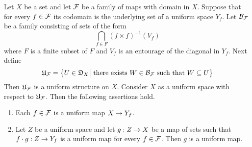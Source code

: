 \begin{theorem}\label{theorem:uniformity_induced_by_family_of_maps}
	Let $X$ be a set and let ${\mathcal F}$ be a family of maps with domain in $X$. Suppose that for every $f \in {\mathcal F}$ its codomain is the underlying set of a uniform space $Y_f$. Let ${\mathcal B}_{{\mathcal F}}$ be a family consisting of sets of the form
	$$\bigcap_{f\in F}\left(f\times f\right)^{-1}(V_f)$$
	where $F$ is a finite subset of $F$ and $V_f$ is an entourage of the diagonal in $Y_f$. Next define
	$${\mathfrak U}_{{\mathcal F}} = \big\{U\in {\mathfrak D}_X\,\big|\,\mbox{there exists }W\in {\mathcal B}_{{\mathcal F}}\mbox{ such that }W \subseteq U\big\}$$
	Then ${\mathfrak U}_{{\mathcal F}}$ is a uniform structure on $X$. Consider $X$ as a uniform space with respect to ${\mathfrak U}_{{\mathcal F}}$. Then the following assertions hold.
	\begin{enumerate}[label=\emph{\textbf{(\arabic*)}}, leftmargin=3.0em]
		\item Each $f \in {\mathcal F}$ is a uniform map $X \rightarrow Y_f$.
		\item Let $Z$ be a uniform space and let $g:Z\rightarrow X$ be a map of sets such that $f\cdot g:Z\rightarrow Y_f$ is a uniform map for every $f\in {\mathcal F}$. Then $g$ is a uniform map.
	\end{enumerate}
\end{theorem}
